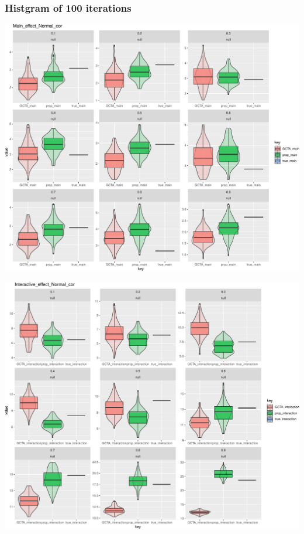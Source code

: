\documentclass[]{article}
\begin{document}

\clearpage

\subsubsection{Histgram of 100
iterations}\label{histgram-of-100-iterations}

\includegraphics{Norl_cor_simulation_files/figure-latex/normal_main-1.pdf}

\includegraphics{Norl_cor_simulation_files/figure-latex/normal_inter-1.pdf}
\end{document}
